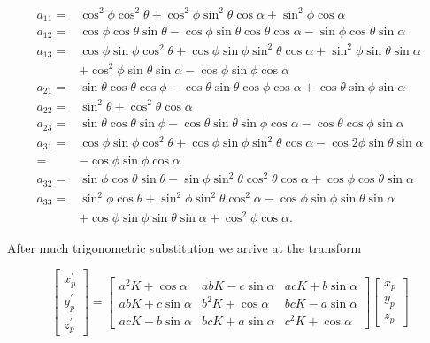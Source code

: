 $$
\begin{aligned}
a_{11}= & \cos ^{2} \phi \cos ^{2} \theta+\cos ^{2} \phi \sin ^{2} \theta \cos \alpha+\sin ^{2} \phi \cos \alpha \\
a_{12}= & \cos \phi \cos \theta \sin \theta-\cos \phi \sin \theta \cos \theta \cos \alpha-\sin \phi \cos \theta \sin \alpha \\
a_{13}= & \cos \phi \sin \phi \cos ^{2} \theta+\cos \phi \sin \phi \sin ^{2} \theta \cos \alpha+\sin ^{2} \phi \sin \theta \sin \alpha \\
& +\cos ^{2} \phi \sin \theta \sin \alpha-\cos \phi \sin \phi \cos \alpha \\
a_{21}= & \sin \theta \cos \theta \cos \phi-\cos \theta \sin \theta \cos \phi \cos \alpha+\cos \theta \sin \phi \sin \alpha \\
a_{22}= & \sin ^{2} \theta+\cos ^{2} \theta \cos \alpha \\
a_{23}= & \sin \theta \cos \theta \sin \phi-\cos \theta \sin \theta \sin \phi \cos \alpha-\cos \theta \cos \phi \sin \alpha \\
a_{31}= & \cos \phi \sin \phi \cos ^{2} \theta+\cos \phi \sin \phi \sin ^{2} \theta \cos \alpha-\cos 2 \phi \sin \theta \sin \alpha \\
= & -\cos \phi \sin \phi \cos \alpha \\
a_{32}= & \sin \phi \cos \theta \sin \theta-\sin \phi \sin ^{2} \theta \cos ^{2} \theta \cos \alpha+\cos \phi \cos \theta \sin \alpha \\
a_{33}= & \sin ^{2} \phi \cos \theta+\sin ^{2} \phi \sin ^{2} \theta \cos ^{2} \alpha-\cos \phi \sin \phi \sin \theta \sin \alpha \\
& +\cos \phi \sin \phi \sin \theta \sin \alpha+\cos ^{2} \phi \cos \alpha .
\end{aligned}
$$

After much trigonometric substitution we arrive at the transform

$$
\left[\begin{array}{c}
x_{p}^{\prime} \\
y_{p}^{\prime} \\
z_{p}^{\prime}
\end{array}\right]=\left[\begin{array}{ccc}
a^{2} K+\cos \alpha & a b K-c \sin \alpha & a c K+b \sin \alpha \\
a b K+c \sin \alpha & b^{2} K+\cos \alpha & b c K-a \sin \alpha \\
a c K-b \sin \alpha & b c K+a \sin \alpha & c^{2} K+\cos \alpha
\end{array}\right]\left[\begin{array}{l}
x_{p} \\
y_{p} \\
z_{p}
\end{array}\right]
$$

